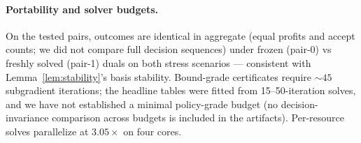 \documentclass[11pt]{article}
\begin{document}
\paragraph{Portability and solver budgets.} On the tested pairs,
outcomes are identical in aggregate (equal profits and accept counts;
we did not compare full decision sequences) under frozen (pair-0) vs
freshly solved (pair-1) duals on both stress scenarios
--- consistent with Lemma~\ref{lem:stability}'s basis stability.
Bound-grade certificates require ${\sim}45$ subgradient iterations;
the headline tables were fitted from 15--50-iteration solves, and we
have not established a minimal policy-grade budget (no
decision-invariance comparison across budgets is included in the
artifacts). Per-resource solves parallelize at $3.05\times$ on four
cores.

\FloatBarrier
\end{document}
